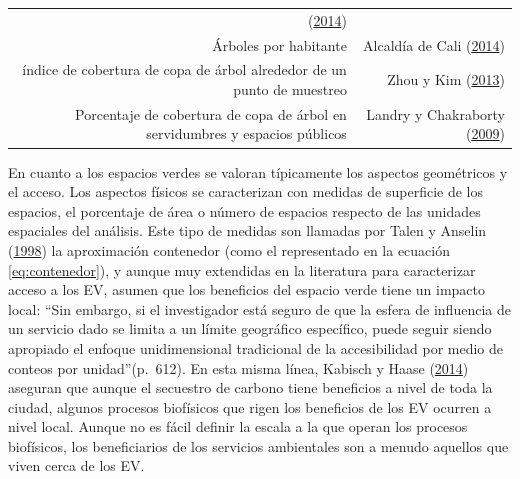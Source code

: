 \documentclass[12pt,a4paper,openany]{book}
\theoremstyle{definition}
\theoremstyle{definition}
\theoremstyle{definition}
\theoremstyle{remark}
\begin{document}
\begin{longtable}[]{@{}rr@{}}
\begin{minipage}[t]{0.31\columnwidth}
(\protect\hyperlink{ref-alanis_estructura_2014}{2014})\strut
\end{minipage}\tabularnewline
\begin{minipage}[t]{0.57\columnwidth}\raggedleft\strut
Árboles por habitante\strut
\end{minipage} & \begin{minipage}[t]{0.31\columnwidth}\raggedleft\strut
Alcaldía de Cali (\protect\hyperlink{ref-pot2014cali}{2014})\strut
\end{minipage}\tabularnewline
\begin{minipage}[t]{0.57\columnwidth}\raggedleft\strut
índice de cobertura de copa de árbol alrededor de un punto de
muestreo\strut
\end{minipage} & \begin{minipage}[t]{0.31\columnwidth}\raggedleft\strut
Zhou y Kim (\protect\hyperlink{ref-zhou_social_2013}{2013})\strut
\end{minipage}\tabularnewline
\begin{minipage}[t]{0.57\columnwidth}\raggedleft\strut
Porcentaje de cobertura de copa de árbol en servidumbres y espacios
públicos\strut
\end{minipage} & \begin{minipage}[t]{0.31\columnwidth}\raggedleft\strut
Landry y Chakraborty
(\protect\hyperlink{ref-landry_street_2009}{2009})\strut
\end{minipage}\tabularnewline
\bottomrule
\end{longtable}

En cuanto a los espacios verdes se valoran típicamente los aspectos
geométricos y el acceso. Los aspectos físicos se caracterizan con
medidas de superficie de los espacios, el porcentaje de área o número de
espacios respecto de las unidades espaciales del análisis. Este tipo de
medidas son llamadas por Talen y Anselin
(\protect\hyperlink{ref-talen_assessing_1998}{1998}) la aproximación
contenedor (como el representado en la ecuación \eqref{eq:contenedor}), y
aunque muy extendidas en la literatura para caracterizar acceso a los
EV, asumen que los beneficios del espacio verde tiene un impacto local:
``Sin embargo, si el investigador está seguro de que la esfera de
influencia de un servicio dado se limita a un límite geográfico
específico, puede seguir siendo apropiado el enfoque unidimensional
tradicional de la accesibilidad por medio de conteos por
unidad''(p.~612). En esta misma línea, Kabisch y Haase
(\protect\hyperlink{ref-kabisch_green_2014}{2014}) aseguran que aunque
el secuestro de carbono tiene beneficios a nivel de toda la ciudad,
algunos procesos biofísicos que rigen los beneficios de los EV ocurren a
nivel local. Aunque no es fácil definir la escala a la que operan los
procesos biofísicos, los beneficiarios de los servicios ambientales son
a menudo aquellos que viven cerca de los EV.
\end{document}

